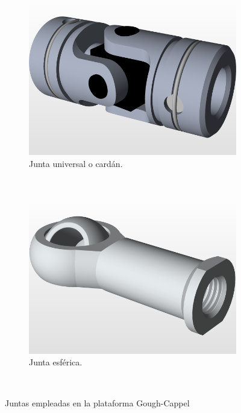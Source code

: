 \begin{figure}[htb!]
 \centering
    \begin{subfigure}[b]{0.4\textwidth}         \includegraphics[width=\textwidth]{03_Reporte/img/CARDAN.png}
        \caption{Junta universal o cardán.}
        \label{fig: junta universal}
    \end{subfigure}
    
    ~ %
    \begin{subfigure}[b]{0.4\textwidth}
         \includegraphics[width=\textwidth]{03_Reporte/img/BALL_JOINT.png}
        \caption{Junta esférica.}
        \label{fig: junta esferica}
    \end{subfigure}
    ~ %
    \caption{Juntas empleadas en la plataforma Gough-Cappel}\label{fig: joints}
\end{figure}

